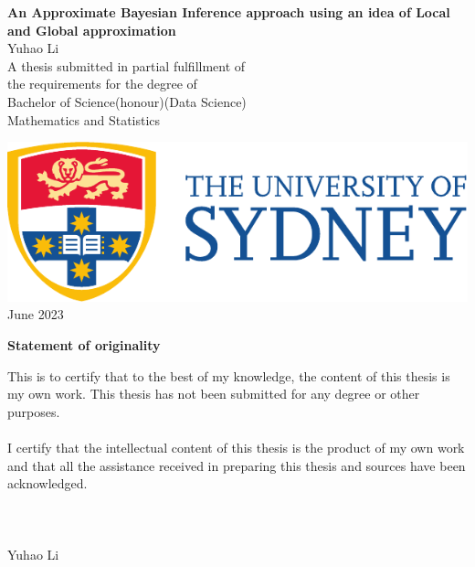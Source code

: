 \begin{titlepage}
\centering
{}
\vspace*{\fill}
\huge{\textbf{{\bf\Huge An Approximate Bayesian Inference approach using an idea of Local and Global approximation}}}\\



\vspace{2.5cm}
\LARGE{Yuhao Li}\\
\vspace{1.5cm}
\large{A thesis submitted in partial fulfillment of \\ the requirements for the degree of \\  Bachelor of Science(honour)(Data Science)} \\
\vspace{1cm}
\large{Mathematics and Statistics}\\
\vspace{1.5cm}
\date{September 2021}
    \includegraphics[scale=0.75]{UsydLogo.pdf}\\
\vspace{1.5cm}
\large{June 2023}\\
\vspace*{\fill}

\thispagestyle{empty}
\end{titlepage}



\pagebreak
\hspace{0pt}
\begin{center}
    \textbf{\large Statement of originality}\\
    \vspace{0.5cm}
\end{center}

\noindent This is to certify that to the best of my knowledge, the content of this thesis is my own work. This thesis has not been submitted for any degree or other purposes.\\
\\
\noindent I certify that the intellectual content of this thesis is the product of my own work and that all the assistance received in preparing this thesis and sources have been acknowledged.\\
\\
\\
\\
Yuhao Li

